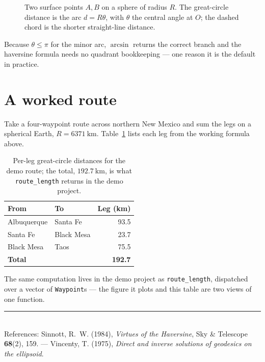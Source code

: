 \documentclass[11pt]{article}
\begin{document}
\begin{figure}[h]
\centering
{}
\caption{Two surface points $A,B$ on a sphere of radius $R$. The great-circle
distance is the arc $d = R\theta$, with $\theta$ the central angle at $O$; the
dashed chord is the shorter straight-line distance.}
\label{fig:gc}
\end{figure}

\noindent Because $\theta \le \pi$ for the minor arc, $\arcsin$ returns the
correct branch and the haversine formula needs no quadrant bookkeeping — one
reason it is the default in practice.

\newpage

\section{A worked route}
Take a four-waypoint route across northern New Mexico and sum the legs on a
spherical Earth, $R = 6371~\mathrm{km}$. Table~\ref{tab:route} lists each leg
from the working formula above.

\begin{table}[h]
\centering
\begin{tabular}{llr}
\toprule
From & To & Leg (km) \\
\midrule
Albuquerque & Santa Fe   & 93.5 \\
Santa Fe    & Black Mesa  & 23.7 \\
Black Mesa  & Taos       & 75.5 \\
\midrule
\multicolumn{2}{l}{\textbf{Total}} & \textbf{192.7} \\
\bottomrule
\end{tabular}
\caption{Per-leg great-circle distances for the demo route; the total,
$192.7~\mathrm{km}$, is what \texttt{route\_length} returns in the demo
project.}
\label{tab:route}
\end{table}

\noindent The same computation lives in the demo project as
\texttt{route\_length}, dispatched over a vector of \texttt{Waypoint}s — the
figure it plots and this table are two views of one function.

\vfill
\noindent\rule{\linewidth}{0.4pt}\\[2pt]
{\small References: Sinnott, R.~W. (1984), \emph{Virtues of the Haversine},
Sky \& Telescope \textbf{68}(2), 159. — Vincenty, T. (1975), \emph{Direct and
inverse solutions of geodesics on the ellipsoid}.}
\end{document}
